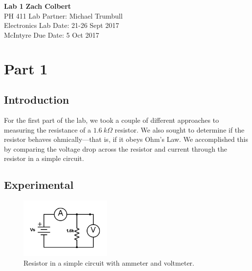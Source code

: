\documentclass[a4paper, 11pt]{article}
\begin{document}
\noindent
\large\textbf{Lab 1} \hfill \textbf{Zach Colbert} \\
\normalsize PH 411 \hfill Lab Partner: Michael Trumbull \\
Electronics  \hfill Lab Date: 21-26 Sept 2017 \\
McIntyre \hfill Due Date: 5 Oct 2017

\section{Part 1}
    \subsection{Introduction}




        For the first part of the lab, we took a couple of different approaches to measuring the resistance of a \(1.6\ k\Omega \) resistor. We also sought to determine if the resistor behaves ohmically---that is, if it obeys Ohm's Law. We accomplished this by comparing the voltage drop across the resistor and current through the resistor in a simple circuit.

    \subsection{Experimental}


        \begin{figure}
            \vspace{-25pt}
            \centering
            \includegraphics[height=3cm]{PH425-Lab1-1b.png}
            \caption{Resistor in a simple circuit with ammeter and voltmeter.}
            \label{fig:circuit-1b}
        \end{figure}
\end{document}
